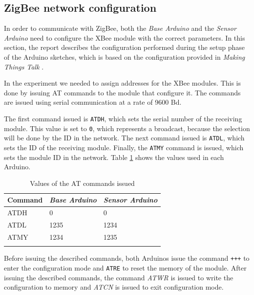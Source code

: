 \documentclass[conference, a4paper]{IEEEtran}
\begin{document}
\subsection{ZigBee network configuration}

In order to communicate with ZigBee, both the \textit{Base Arduino} and the \textit{Sensor Arduino} need to configure the XBee module with the correct parameters. In this section, the report describes the configuration performed during the setup phase of the Arduino sketches, which is based on the configuration provided in \textit{Making Things Talk} \cite[Chapter~6]{igoe2007making}.

In the experiment we needed to assign addresses for the XBee modules. This is done by issuing AT commands to the module that configure it. The commands are issued using serial communication at a rate of 9600 Bd.

The first command issued is \texttt{ATDH}, which sets the serial number of the receiving module. This value is set to \texttt{0}, which represents a broadcast, because the selection will be done by the ID in the network. The next command issued is \texttt{ATDL}, which sets the ID of the receiving module. Finally, the \texttt{ATMY} command is issued, which sets the module ID in the network. Table \ref{table_vals} shows the values used in each Arduino.

\begin{table}[h]
\centering
\begin{tabular}{lll}
Command                     & \textit{Base Arduino}    & \textit{Sensor Arduino}  \\ \hline
\rowcolor[HTML]{EFEFEF} 
{\color[HTML]{333333} ATDH} & {\color[HTML]{333333} 0} & {\color[HTML]{333333} 0} \\
ATDL                        & 1235                     & 1234                     \\
\rowcolor[HTML]{EFEFEF} 
ATMY                        & 1234                     & 1235                     \\
                            &                          &
\end{tabular}
\caption{Values of the AT commands issued}
\label{table_vals}
\end{table}

Before issuing the described commands, both Arduinos issue the command \texttt{+++} to enter the configuration mode and \texttt{ATRE} to reset the memory of the module. After issuing the described commands, the command \textit{ATWR} is issued to write the configuration to memory and \textit{ATCN} is issued to exit configuration mode.
\end{document}
